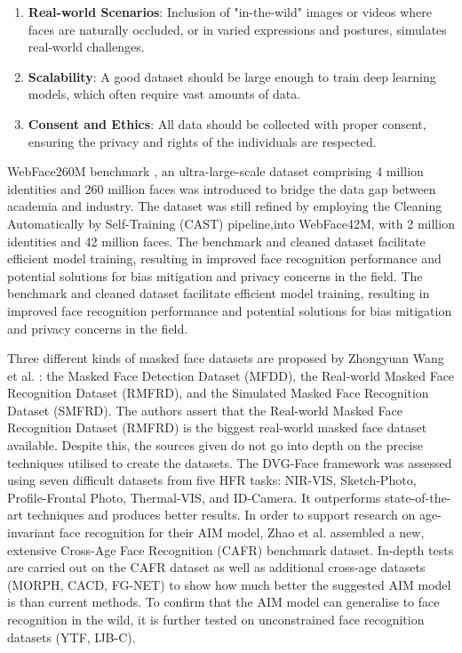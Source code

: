 \begin{enumerate}
    \item \textbf{Real-world Scenarios}: Inclusion of "in-the-wild" images or videos where faces are naturally occluded, or in varied expressions and postures, simulates real-world challenges.

    \item \textbf{Scalability}: A good dataset should be large enough to train deep learning models, which often require vast amounts of data.

    \item \textbf{Consent and Ethics}: All data should be collected with proper consent, ensuring the privacy and rights of the individuals are respected.
\end{enumerate}



WebFace260M benchmark \cite{zhu_webface260m_2023}, an ultra-large-scale dataset comprising 4 million identities and 260 million faces was introduced to bridge the data gap between academia and industry. The dataset was still refined by employing the Cleaning Automatically by Self-Training (CAST) pipeline,into WebFace42M, with 2 million identities and 42 million faces. The benchmark and cleaned dataset facilitate efficient model training, resulting in improved face recognition performance and potential solutions for bias mitigation and privacy concerns in the field. The benchmark and cleaned dataset facilitate efficient model training, resulting in improved face recognition performance and potential solutions for bias mitigation and privacy concerns in the field.

Three different kinds of masked face datasets are proposed by Zhongyuan Wang et al. \cite{wang_masked_2023}: the Masked Face Detection Dataset (MFDD), the Real-world Masked Face Recognition Dataset (RMFRD), and the Simulated Masked Face Recognition Dataset (SMFRD). The authors assert that the Real-world Masked Face Recognition Dataset (RMFRD) is the biggest real-world masked face dataset available. Despite this, the sources given do not go into depth on the precise techniques utilised to create the datasets. The DVG-Face framework \cite{fu_dvg-face_2022} was assessed using seven difficult datasets from five HFR tasks: NIR-VIS, Sketch-Photo, Profile-Frontal Photo, Thermal-VIS, and ID-Camera. It outperforms state-of-the-art techniques and produces better results. In order to support research on age-invariant face recognition for their AIM model, Zhao et al. \cite{zhao_towards_2022} assembled a new, extensive Cross-Age Face Recognition (CAFR) benchmark dataset. In-depth tests are carried out on the CAFR dataset as well as additional cross-age datasets (MORPH, CACD, FG-NET) to show how much better the suggested AIM model is than current methods. To confirm that the AIM model can generalise to face recognition in the wild, it is further tested on unconstrained face recognition datasets (YTF, IJB-C).

